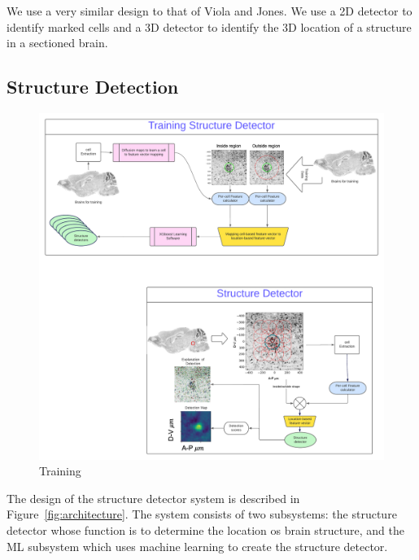 \documentclass[11pt]{article}
\begin{document}
We use a very similar design to that of Viola and Jones. We use a 2D
detector to identify marked cells and a 3D detector to identify the 3D
location of a structure in a sectioned brain.


\subsection{Structure Detection}

\begin{figure}[t]
  \includegraphics[width=\textwidth]{figures/Training.pdf}
  \caption{Training \label{fig:training}}
\end{figure}
The design of the structure detector system is described in Figure~\ref{fig:architecture}.
The system consists of two subsystems: the structure detector whose
function is to determine the location os brain structure, and the ML
subsystem which uses machine learning to create the structure detector.
\end{document}
